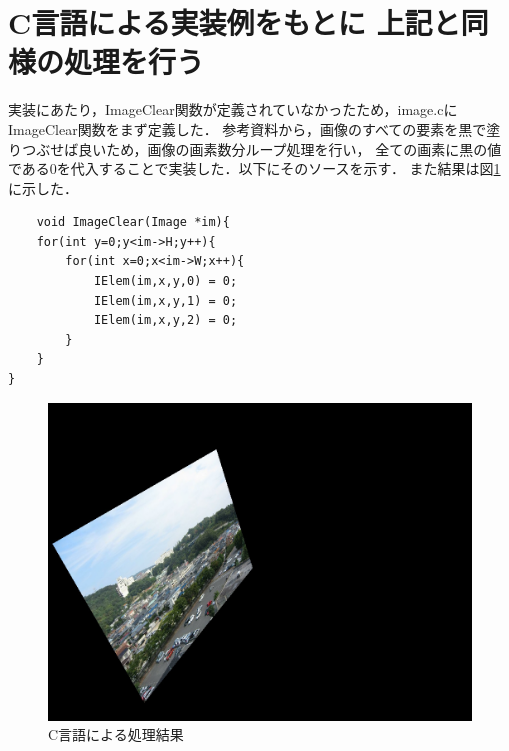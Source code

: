 \documentclass[11pt]{jarticle}
\begin{document}
\section{C言語による実装例をもとに 上記と同様の処理を行う}
実装にあたり，ImageClear関数が定義されていなかったため，image.cにImageClear関数をまず定義した．
参考資料から，画像のすべての要素を黒で塗りつぶせば良いため，画像の画素数分ループ処理を行い，
全ての画素に黒の値である0を代入することで実装した．以下にそのソースを示す．
また結果は図\ref{cgengo}に示した．

\begin{verbatim}
    void ImageClear(Image *im){
    for(int y=0;y<im->H;y++){
        for(int x=0;x<im->W;x++){
            IElem(im,x,y,0) = 0;
            IElem(im,x,y,1) = 0;
            IElem(im,x,y,2) = 0;
        }
    }
}
\end{verbatim}
\begin{figure}[h]
    \centering
    \includegraphics[scale=.15]{out1.jpg}
    \caption{C言語による処理結果}
    \label{cgengo}
\end{figure}
\end{document}
